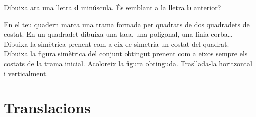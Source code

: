 \begin{mylist}
\exer  Dibuixa ara una lletra \textbf{d} minúscula. És semblant a la lletra \textbf{b} anterior?


\exer  En el teu quadern marca una trama formada per quadrats de dos quadradets de costat. En un quadradet dibuixa una taca, una poligonal, una línia corba{\dots} Dibuixa la simètrica prenent com a eix de simetria un costat del quadrat. Dibuixa la figura simètrica del conjunt obtingut prenent com a eixos sempre els costats de la trama inicial. Acoloreix la figura obtinguda. Trasllada-la horitzontal i verticalment.


\end{mylist}
 
\section{Translacions}
\vspace{-0.25cm}
